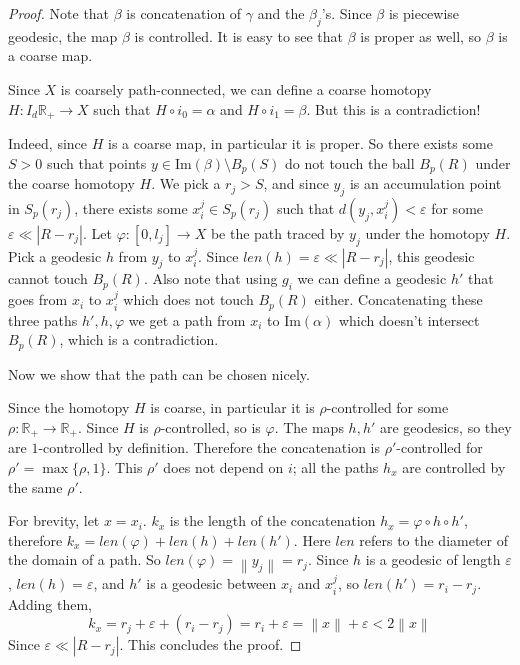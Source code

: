 \documentclass {amsart}
\newcommand {\Rplus}    {\mathbb{R}_{+}}
\newcommand {\im}       {\text{Im}}
\newcommand {\norm} [1] {\left\| #1 \right\|}
\theoremstyle {definition}
\begin{document}
\begin{proof}
  Note that \( \beta \) is concatenation of \( \gamma \) and the \( \beta_j
  \)'s. Since \( \beta \) is piecewise geodesic, the map \( \beta \) is
  controlled. It is easy to see that \( \beta \) is proper as well, so \(
  \beta \) is a coarse map.

  Since \( X \) is coarsely path-connected, we can define a coarse
  homotopy \( H : I_d \Rplus \to X \) such that \( H \circ i_0 = \alpha \) and
  \( H \circ i_1 = \beta \). But this is a contradiction!

  Indeed, since \( H \) is a coarse map, in particular it is proper. So there
  exists some \( S > 0 \) such that points \( y \in \im(\beta) \setminus B_{p}
  (S) \) do not touch the ball \( B_{p} (R) \) under the coarse homotopy \( H \).
  We pick a \( r_{j} > S \), and since \( y_{j} \) is an accumulation point in \(
  S_{p} (r_j )\), there exists some \( x_i ^j \in S_{p} (r_j) \) such that \(
  d(y_j, x_i^j) < \varepsilon \) for some \( \varepsilon \ll |R - r_j| \). Let \(
  \varphi : [0, l_j] \to X \) be the path traced by \( y_j \) under the homotopy
  \( H \). Pick a geodesic \( h \) from \( y_j \) to \( x_i^j \). Since \( len(h)
  = \varepsilon \ll |R - r_j| \), this geodesic cannot touch \( B_{p} (R) \).
  Also note that using \( g_i \) we can define a geodesic \( h' \) that goes from
  \( x_i \) to \( x_i^j \) which does not touch \( B_{p} (R) \) either.
  Concatenating these three paths \( h', h, \varphi \) we get a path from \( x_i
  \) to \( \im(\alpha) \) which doesn't intersect \( B_{p} (R) \), which is a
  contradiction.

  Now we show that the path can be chosen nicely.

  Since the homotopy \( H \) is coarse, in particular it is \( \rho
  \)-controlled for some \( \rho : \Rplus \to \Rplus \). Since \( H \) is \(
  \rho \)-controlled, so is \( \varphi \). The maps \( h,h' \) are geodesics,
  so they are \( 1 \)-controlled by definition. Therefore the concatenation is
  \( \rho' \)-controlled for \( \rho' = \max \{ \rho, 1 \} \). This \( \rho' \)
  does not depend on \( i \); all the paths \( h_x \) are controlled by the same
  \( \rho' \).

  For brevity, let \( x = x_i \). \( k_x \) is the length of the concatenation
  \( h_x = \varphi \circ h \circ h' \), therefore \( k_x = len (\varphi) + len
  (h) + len (h') \). Here \( len \) refers to the diameter of the domain of a
  path. So \( len(\varphi) = \norm {y_j} = r_j \). Since \( h \) is a geodesic
  of length \( \varepsilon \), \( len(h) = \varepsilon \), and \( h' \) is a
  geodesic between \( x_i \) and \(x_i^j \), so \( len(h') = r_i - r_j \).
  Adding them,
  \[
       k_x = r_j + \varepsilon + (r_i - r_j) = r_i + \varepsilon
          = \norm x + \varepsilon < 2 \norm x
  \] 
  Since \( \varepsilon \ll |R - r_j| \). This concludes the proof.
\end{proof}
\end{document}
